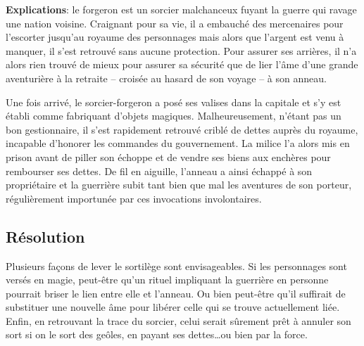 \documentclass[a5paper,pagesize,10pt,bibliography=totoc,numbers=enddot,
headings=normal,DIV=9,twoside=false,tablecaptionabove]{scrbook}
\begin{document}
\textbf{Explications}: le forgeron est un sorcier malchanceux fuyant la guerre qui ravage une nation voisine.
Craignant pour sa vie, il a embauché des mercenaires pour l'escorter jusqu'au royaume des personnages mais alors que l'argent est venu à manquer, il s'est retrouvé sans aucune protection.
Pour assurer ses arrières, il n'a alors rien trouvé de mieux pour assurer sa sécurité que de lier l'âme d'une grande aventurière à la retraite -- croisée au hasard de son voyage -- à son anneau.

Une fois arrivé, le sorcier-forgeron a posé ses valises dans la capitale et s'y est établi comme fabriquant d'objets magiques.
Malheureusement, n'étant pas un bon gestionnaire, il s'est rapidement retrouvé criblé de dettes auprès du royaume, incapable d'honorer les commandes du gouvernement.
La milice l'a alors mis en prison avant de piller son échoppe et de vendre ses biens aux enchères pour rembourser ses dettes.
De fil en aiguille, l'anneau a ainsi échappé à son propriétaire et la guerrière subit tant bien que mal les aventures de son porteur, régulièrement importunée par ces invocations involontaires.

\subsection*{Résolution}

Plusieurs façons de lever le sortilège sont envisageables.
Si les personnages sont versés en magie, peut-être qu'un rituel impliquant la guerrière en personne pourrait briser le lien entre elle et l'anneau.
Ou bien peut-être qu'il suffirait de substituer une nouvelle âme pour libérer celle qui se trouve actuellement liée.
Enfin, en retrouvant la trace du sorcier, celui serait sûrement prêt à annuler son sort si on le sort des geôles, en payant ses dettes\dots ou bien par la force.































\end{document}

